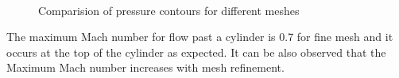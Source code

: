 \documentclass[12pt]{elsarticle}
\begin{document}
	
	\begin{figure}[ht]
		\centering
		\\
		\caption{Comparision of pressure contours for different meshes}
		\label{figure2}
	\end{figure}
	\clearpage
	The maximum Mach number for flow past a cylinder is 0.7 for fine mesh and it occurs at the top of the cylinder as expected. It can be also observed that the Maximum Mach number increases with mesh refinement. 
	
\end{document}

